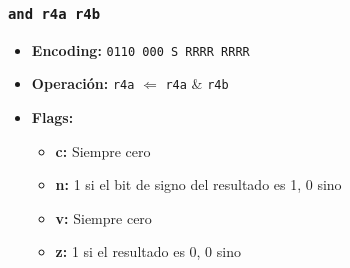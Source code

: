 \documentclass{article}
\begin{document}
\subsubsection{\texttt{and r4a r4b}}
\begin{itemize}
    \item \textbf{Encoding:} \texttt{0110 000 S RRRR RRRR}
    \item \textbf{Operación:} \texttt{r4a} $\Leftarrow$ \texttt{r4a} \& \texttt{r4b}
    \item \textbf{Flags:}
        \begin{itemize}
            \item \textbf{c:} Siempre cero
            \item \textbf{n:} 1 si el bit de signo del resultado es 1, 0 sino
            \item \textbf{v:} Siempre cero
            \item \textbf{z:} 1 si el resultado es 0, 0 sino
        \end{itemize}
\end{itemize}
\end{document}
